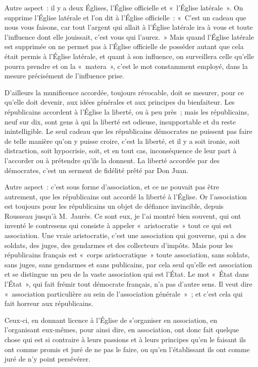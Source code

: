 \documentclass[french,twoside]{book} %
\begin{document}
\noindent Autre aspect : il y a deux Églises, l’Église officielle et « l’Église latérale ». On supprime l’Église latérale et l’on dit à l’Église officielle : « C’est un cadeau  que nous vous faisons, car tout l’argent qui allait à l’Église latérale ira à vous et toute l’influence dont elle jouissait, c’est vous qui l’aurez. » Mais quand l’Église latérale est supprimée on ne permet pas à l’Église officielle de posséder autant que cela était permis à l’Église latérale, et quant à son influence, on surveillera celle qu’elle pourra prendre et on la « matera », c’est le mot constamment employé, dans la mesure précisément de l’influence prise.\par
D’ailleurs la munificence accordée, toujours révocable, doit se mesurer, pour ce qu’elle doit devenir, aux idées générales et aux principes du bienfaiteur. Les républicains accordent à l’Église la liberté, ou à peu près ; mais les républicains, neuf sur dix, sont gens à qui la liberté est odieuse, insupportable et du reste inintelligible. Le seul cadeau que les républicains démocrates ne puissent pas faire de telle manière qu’on y puisse croire, c’est la liberté, et il y a soit ironie, soit distraction, soit hypocrisie, soit, et en tout cas, inconséquence de leur part à l’accorder ou à prétendre qu’ils la donnent. La liberté accordée par des démocrates, c’est un serment de fidélité prêté par Don Juan.\par
Autre aspect : c’est sous forme d’association, et ce ne pouvait pas être autrement, que les républicains ont accordé la liberté à l’Église. Or l’association  est toujours pour les républicains un objet de défiance invincible, depuis Rousseau jusqu’à M. Jaurès. Ce sont eux, je l’ai montré bien souvent, qui ont inventé le contresens qui consiste à appeler « aristocratie » tout ce qui est association. Une vraie aristocratie, c’est une association qui gouverne, qui a des soldats, des juges, des gendarmes et des collecteurs d’impôts. Mais pour les républicains français est « corps aristocratique » toute association, sans soldats, sans juges, sans gendarmes et sans publicains, par cela seul qu’elle est association et se distingue un peu de la vaste association qui est l’État. Le mot « État dans l’État », qui fait frémir tout démocrate français, n’a pas d’autre sens. Il veut dire « association particulière au sein de l’association générale » ; et c’est cela qui fait horreur aux républicains.\par
Ceux-ci, en donnant licence à l’Église de s’organiser en association, en l’organisant eux-mêmes, pour ainsi dire, en association, ont donc fait quelque chose qui est si contraire à leurs passions et à leurs principes qu’en le faisant ils ont comme promis et juré de ne pas le faire, ou qu’en l’établissant ils ont comme juré de n’y point persévérer.\par
\end{document}
